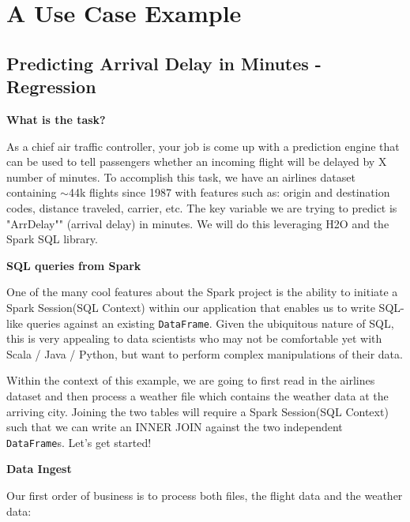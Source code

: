 \section{A Use Case Example}


\subsection{Predicting Arrival Delay in Minutes - Regression}

\textbf{What is the task?}

As a chief air traffic controller, your job is come up with a prediction engine that can be used to tell passengers whether an incoming flight will be delayed by X number of minutes. To accomplish this task, we have an airlines dataset containing ${\sim}$44k flights since 1987 with features such as: origin and destination codes, distance traveled, carrier, etc.  The key variable we are trying to predict is "ArrDelay"" (arrival delay) in minutes. We will do this leveraging H2O and the Spark SQL library.

\textbf{SQL queries from Spark}

One of the many cool features about the Spark project is the ability to initiate a Spark Session(SQL Context) within our application that enables us to write SQL-like queries against an existing \texttt{DataFrame}. Given the ubiquitous nature of SQL, this is very appealing to data scientists who may not be comfortable yet with Scala / Java / Python, but want to perform complex manipulations of their data.

Within the context of this example, we are going to first read in the airlines dataset and then process a weather file which contains the weather data at the arriving city. Joining the two tables will require a Spark Session(SQL Context) such that we can write an INNER JOIN against the two independent \texttt{DataFrame}s.  Let's get started!

\newpage
\textbf{Data Ingest}

Our first order of business is to process both files, the flight data and the weather data:

